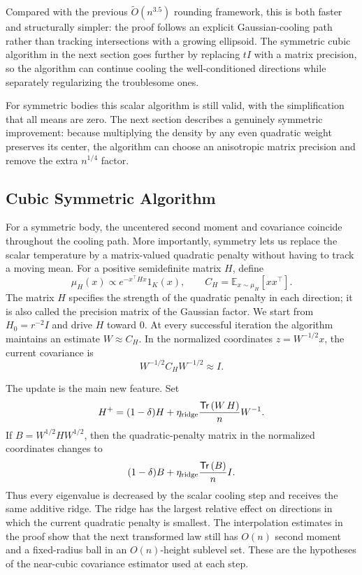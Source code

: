 \documentclass[11pt]{article}
\numberwithin{equation}{section}
\theoremstyle{definition}
\renewcommand{\O}{\widetilde{O}}
\newcommand{\E}[2]{\mathbb{E}_{#1}\left[#2\right]}
\newcommand{\Tr}[1]{\mathsf{Tr}\left(#1\right)}
\begin{document}
Compared with the previous $\O(n^{3.5})$ rounding framework, this is both faster
and structurally simpler: the proof follows an explicit Gaussian-cooling path
rather than tracking intersections with a growing ellipsoid.
The symmetric cubic algorithm in the next section goes further by replacing $tI$
with a matrix precision, so the algorithm can continue cooling the
well-conditioned directions while separately regularizing the troublesome ones.

For symmetric bodies this scalar algorithm is still valid, with the
simplification that all means are zero.
The next section describes a genuinely symmetric improvement: because
multiplying the density by any even quadratic weight preserves its center, the
algorithm can choose an anisotropic matrix precision and remove the extra
$n^{1/4}$ factor.

\subsection{Cubic Symmetric Algorithm}
\label{subsec:overview-cubic-symmetric}

For a symmetric body, the uncentered second moment and covariance coincide
throughout the cooling path.
More importantly, symmetry lets us replace the scalar temperature by a
matrix-valued quadratic penalty without having to track a moving mean.
For a positive semidefinite matrix $H$, define
\[
\mu_H(x)\propto e^{-x^\top Hx}1_K(x),
\qquad
C_H=\E{x\sim\mu_H}{xx^\top}.
\]
The matrix $H$ specifies the strength of the quadratic penalty in each
direction; it is also called the precision matrix of the Gaussian factor.
We start from $H_0=r^{-2}I$ and drive
$H$ toward
$0$.
At every successful iteration the algorithm maintains an estimate
$W\approx C_H$.
In the normalized coordinates $z=W^{-1/2}x$, the current covariance is
\[
 W^{-1/2}C_HW^{-1/2}\approx I.
\]

The update is the main new feature.
Set
\[
H^+=(1-\delta)H+
\eta_{\rm ridge}\frac{\Tr{W\,H}}{n}W^{-1}.
\]
If $B=W^{1/2}HW^{1/2}$, then the quadratic-penalty matrix in the normalized
coordinates changes to
\[
 (1-\delta)B+
 \eta_{\rm ridge}\frac{\Tr{B}}{n}I.
\]
Thus every eigenvalue is decreased by the scalar cooling step and receives the
same additive ridge.
The ridge has the largest relative effect on directions in which the current
quadratic penalty is smallest.
The interpolation estimates in the proof show that the next transformed law
still has $O(n)$ second moment and a fixed-radius ball in an
$O(n)$-height sublevel set.
These are the hypotheses of the near-cubic covariance estimator used at each
step.
\end{document}
